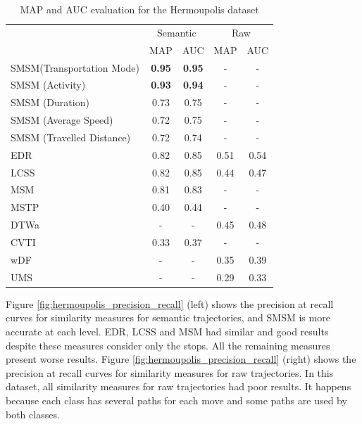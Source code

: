 \documentclass[12pt]{article}
\begin{document}
\begin{table}[h]
\scriptsize
  \centering
  \begin{tabular}{|l|c|c|c|c|}
  	\hline
 & \multicolumn{2}{c}{Semantic} & \multicolumn{2}{|c|}{Raw} \\
 	\cline{2-5}
 & MAP & AUC & MAP & AUC \\
  	\hline
SMSM(Transportation Mode)& \textbf{0.95} & \textbf{0.95} & - & -\\
SMSM (Activity)& \textbf{0.93} & \textbf{0.94} & - & -\\
SMSM (Duration)& 0.73 & 0.75 & - & -\\
SMSM (Average Speed)& 0.72 & 0.75 & - & -\\
SMSM (Travelled Distance)& 0.72 & 0.74 & - & -\\
EDR & 0.82 & 0.85 & 0.51 & 0.54 \\
LCSS & 0.82 & 0.85 & 0.44 & 0.47 \\
MSM & 0.81 & 0.83 & - & - \\
MSTP & 0.40 & 0.44 & - & - \\
DTWa & - & - & 0.45 & 0.48 \\
CVTI & 0.33 & 0.37 & - & - \\
wDF & - & - & 0.35 & 0.39 \\
UMS & - & - & 0.29 & 0.33 \\
    \hline
  \end{tabular}
  \caption{MAP and AUC evaluation for the Hermoupolis dataset}
  \label{tab:hermoupolis_measures_map_auc}
\end{table}

Figure \ref{fig:hermoupolis_precision_recall} (left) shows the precision at recall curves for similarity measures for semantic trajectories, and SMSM is more accurate at each level. EDR, LCSS and MSM had similar and good results despite these measures consider only the stops. All the remaining measures present worse results. Figure \ref{fig:hermoupolis_precision_recall} (right) shows the precision at recall curves for similarity measures for raw trajectories. In this dataset, all similarity measures for raw trajectories had poor results. It happens because each class has several paths for each move and some paths are used by both classes.
\end{document}
